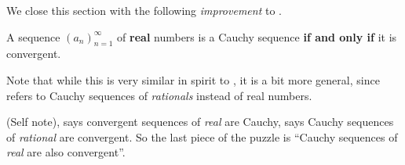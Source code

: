 We close this section with the following \emph{improvement} to .

\begin{theorem}  \label{thm 6.4.18}
A sequence \((a_n)_{n = 1}^{\infty}\) of \textbf{real} numbers is a Cauchy sequence \textbf{if and only if} it is convergent.
\end{theorem}

\begin{remark} \label{remark 6.4.19}
Note that while this is very similar in spirit to , it is a bit more general, since  refers to Cauchy sequences of \emph{rationals} instead of real numbers.

(Self note),  says convergent sequences of \emph{real} are Cauchy,  says Cauchy sequences of \emph{rational} are convergent.
So the last piece of the puzzle is ``Cauchy sequences of \emph{real} are also convergent''.
\end{remark}

